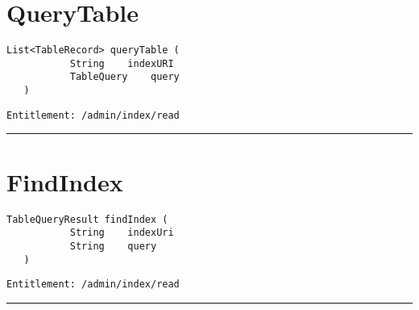 \section{QueryTable}
\label{Api:QueryTable}
\begin{lstlisting}[style=nonumbers]
   List<TableRecord> queryTable (
           String    indexURI
           TableQuery    query
   )
\end{lstlisting}
\begin{Verbatim}[formatcom=\color{Maroon}]
  Entitlement: /admin/index/read
\end{Verbatim}



\rule{12cm}{2pt}
\section{FindIndex}
\label{Api:FindIndex}
\begin{lstlisting}[style=nonumbers]
   TableQueryResult findIndex (
           String    indexUri
           String    query
   )
\end{lstlisting}
\begin{Verbatim}[formatcom=\color{Maroon}]
  Entitlement: /admin/index/read
\end{Verbatim}



\rule{12cm}{2pt}
